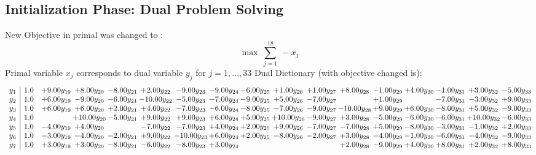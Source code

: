 \documentclass[9pt]{article}
\begin{document}
\subsection{Initialization Phase: Dual Problem Solving}
New Objective in primal was changed to : \[ \max\ \sum_{j=1}^{18}\ - x_j \] 
Primal variable $x_j$ corresponds to dual variable $y_j$ for $j = 1,\ldots,33$
Dual Dictionary (with objective changed is): 
\[\begin{array}{c| c c@{\hskip 2pt} c@{\hskip 2pt} c@{\hskip 2pt} c@{\hskip 2pt} c@{\hskip 2pt} c@{\hskip 2pt} c@{\hskip 2pt} c@{\hskip 2pt} c@{\hskip 2pt} c@{\hskip 2pt} c@{\hskip 2pt} c@{\hskip 2pt} c@{\hskip 2pt} c@{\hskip 2pt} c@{\hskip 2pt} }
 y_{1}   &  1.0 & +  9.00 y_{19} & +  8.00 y_{20} & -8.00 y_{21} & +  2.00 y_{22} & -9.00 y_{23} & -9.00 y_{24} & -6.00 y_{25} & +  1.00 y_{26} & +  1.00 y_{27} & +  8.00 y_{28} & -1.00 y_{29} & +  4.00 y_{30} & -1.00 y_{31} & +  3.00 y_{32} & -5.00 y_{33}\\
 y_{2}   &  1.0 & +  6.00 y_{19} & -9.00 y_{20} & -6.00 y_{21} & -10.00 y_{22} & -5.00 y_{23} & -7.00 y_{24} & -9.00 y_{25} & +  5.00 y_{26} & -7.00 y_{27} &   & +  1.00 y_{29} &   & -7.00 y_{31} & -3.00 y_{32} & +  9.00 y_{33}\\
 y_{3}   &  1.0 & +  6.00 y_{19} & +  6.00 y_{20} & +  2.00 y_{21} & +  4.00 y_{22} & -7.00 y_{23} & -6.00 y_{24} & -8.00 y_{25} & -7.00 y_{26} & -9.00 y_{27} & -10.00 y_{28} & +  9.00 y_{29} & +  6.00 y_{30} & -8.00 y_{31} & +  5.00 y_{32} & -9.00 y_{33}\\
 y_{4}   &  1.0  &   & + 10.00 y_{20} & -5.00 y_{21} & +  9.00 y_{22} & +  9.00 y_{23} & +  6.00 y_{24} & +  5.00 y_{25} & + 10.00 y_{26} & -9.00 y_{27} & +  3.00 y_{28} & -5.00 y_{29} & -6.00 y_{30} & -6.00 y_{31} & + 10.00 y_{32} & -6.00 y_{33}\\
 y_{5}   &  1.0 & -4.00 y_{19} & +  4.00 y_{20} &   & -7.00 y_{22} & -7.00 y_{23} & +  4.00 y_{24} & +  2.00 y_{25} & +  9.00 y_{26} & -7.00 y_{27} & -7.00 y_{28} & +  5.00 y_{29} & -8.00 y_{30} & -3.00 y_{31} & -1.00 y_{32} & +  2.00 y_{33}\\
 y_{6}   &  1.0 & -3.00 y_{19} & -4.00 y_{20} & -2.00 y_{21} & +  9.00 y_{22} & -10.00 y_{23} & +  6.00 y_{24} & +  2.00 y_{25} & -8.00 y_{26} & -2.00 y_{27} & +  3.00 y_{28} & -4.00 y_{29} & -1.00 y_{30} & -6.00 y_{31} & -4.00 y_{32} & -9.00 y_{33}\\
 y_{7}   &  1.0 & +  3.00 y_{19} & +  3.00 y_{20} & -8.00 y_{21} & -6.00 y_{22} & -8.00 y_{23} & +  3.00 y_{24} &    &    &   & +  2.00 y_{28} & -9.00 y_{29} & +  4.00 y_{30} & +  8.00 y_{31} & +  2.00 y_{32} & +  8.00 y_{33}\\

\end{array}\]
\end{document}
